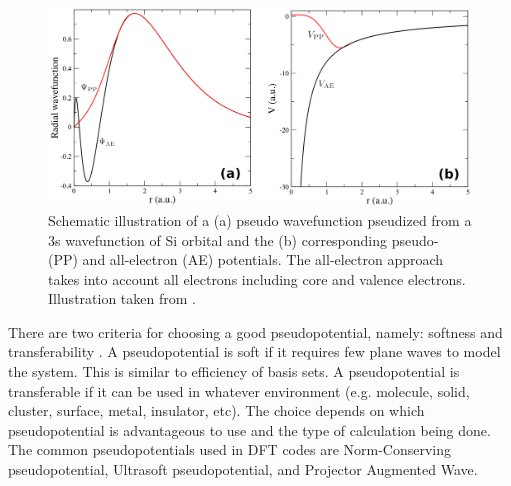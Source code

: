     \begin{figure}[tbh!]
        \centering
        \includegraphics[width=0.8\linewidth]{"images/computational/PP_combine"}
        \caption[ Schematic illustration of a pseudo wavefunction pseudized from a 3s wavefunction of Si orbital]{Schematic illustration of a  (a) pseudo wavefunction pseudized from a 3s wavefunction of Si orbital and the (b) corresponding pseudo- (PP) and all-electron (AE) potentials. The all-electron approach takes into account all electrons including core and valence electrons. Illustration taken from \citep{Jochym2008}.}
        \label{fig:PP}
    \end{figure}

There are two criteria for choosing a good pseudopotential, namely: softness and transferability \citep{Troullier1990,Fuchs1999}. A pseudopotential is soft  if it requires few plane waves to model the system. This is similar to efficiency of basis sets. A pseudopotential is transferable  if it can be used in whatever environment (e.g. molecule, solid, cluster, surface, metal, insulator, etc). The choice depends on which pseudopotential is advantageous to use  and the type of calculation being done. The common pseudopotentials used in DFT codes are Norm-Conserving pseudopotential, Ultrasoft pseudopotential, and Projector Augmented Wave. 

